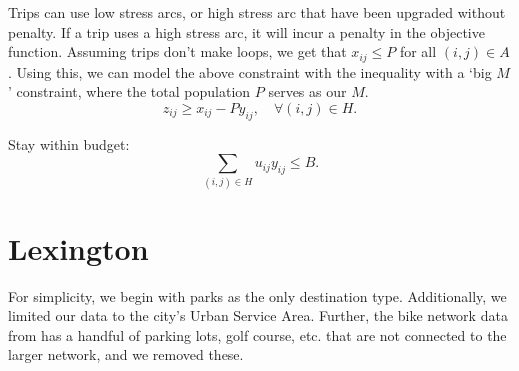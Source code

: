 \documentclass[12pt,letterpaper]{article}
\begin{document}
Trips can use low stress arcs, or high stress arc that have been upgraded without penalty. 
If a trip uses a high stress arc, it will incur a penalty in the objective function. 
Assuming trips don't make loops, we get that $x_{ij}\leq P$ for all $(i,j)\in A$. 
Using this, we can model the above constraint with the inequality with a `big $M$' constraint, where the total population $P$ serves as our $M$. 
\[z_{ij}\geq x_{ij}-Py_{ij} , \quad \forall (i,j)\in H .\]

Stay within budget:
\[ \sum_{(i,j)\in H} u_{ij}y_{ij} \leq B. \]

\section{Lexington}

For simplicity, we begin with parks as the only destination type. 
Additionally, we limited our data to the city's Urban Service Area.
Further, the bike network data from \cite{pfb} has a handful of parking lots, golf course, etc. that are not connected to the larger network, and we removed these. 

\printbibliography
\end{document}
